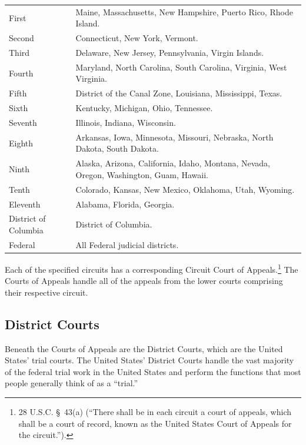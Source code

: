 \begin{center}
  \begin{tabular}{ | l | p{8cm} | }
   \hline 
    \raisebox{-1.0ex}{\begin{large} \textbf{Circuit} \end{large}} & \raisebox{-1.0ex}{\begin{large} \textbf{Composition} \end{large}} \\ [1ex] \hline

First & Maine, Massachusetts, New Hampshire, Puerto Rico, Rhode Island.\\ \hline
Second & Connecticut, New York, Vermont.\\ \hline
Third & Delaware, New Jersey, Pennsylvania, Virgin Islands.\\ \hline
Fourth & Maryland, North Carolina, South Carolina, Virginia, West Virginia.\\ \hline
Fifth & District of the Canal Zone, Louisiana, Mississippi, Texas.\\ \hline
Sixth & Kentucky, Michigan, Ohio, Tennessee.\\ \hline
Seventh & Illinois, Indiana, Wisconsin.\\ \hline
Eighth & Arkansas, Iowa, Minnesota, Missouri, Nebraska, North Dakota, South Dakota.\\ \hline
Ninth & Alaska, Arizona, California, Idaho, Montana, Nevada, Oregon, Washington, Guam, Hawaii.\\ \hline
Tenth & Colorado, Kansas, New Mexico, Oklahoma, Utah, Wyoming.\\ \hline
Eleventh & Alabama, Florida, Georgia.\\ \hline
District of Columbia & District of Columbia.\\ \hline
Federal & All Federal judicial districts.\\ \hline

  \end{tabular}
\end{center}

Each of the specified circuits has a corresponding Circuit Court of Appeals.\footnote{28 U.S.C. \S\ 43(a) (``There shall be in each circuit a court of appeals, which shall be a court of record, known as the United States Court of Appeals for the circuit.'').}  The Courts of Appeals handle all of the appeals from the lower courts comprising their respective circuit.

\subsection{District Courts}
Beneath the Courts of Appeals are the District Courts, which are the United States' trial courts.  The United States' District Courts handle the vast majority of the federal trial work in the United States and perform the functions that most people generally think of as a ``trial.''


